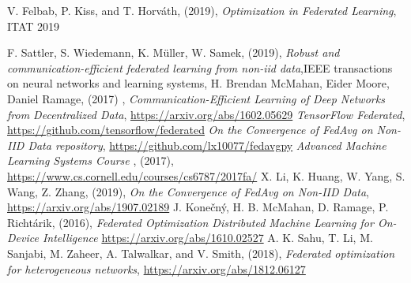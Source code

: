 \documentclass{article}
\theoremstyle{theorem}
\theoremstyle{definition}
\begin{document}
	\begin{thebibliography}{5}
			V. Felbab, P. Kiss, and T. Horváth, (2019), \textit{Optimization in Federated Learning}, ITAT 2019
	
		
		F. Sattler, S. Wiedemann, K. Müller, W. Samek,  (2019), \textit{Robust and communication-efficient federated learning from non-iid data},IEEE transactions on neural networks and learning systems,
		H. Brendan McMahan, Eider Moore, Daniel Ramage, (2017) , \textit{Communication-Efficient Learning of Deep Networks
			from Decentralized Data}, \href{https://arxiv.org/abs/1602.05629}{https://arxiv.org/abs/1602.05629}  
		\textit{TensorFlow Federated}, \href{ https://github.com/tensorflow/federated }{https://github.com/tensorflow/federated}
		\textit{On the Convergence of FedAvg on Non-IID Data
			repository}, \href{ https://github.com/lx10077/fedavgpy }{https://github.com/lx10077/fedavgpy}
	\textit{Advanced Machine Learning Systems Course} , (2017),  \href{https://www.cs.cornell.edu/courses/cs6787/2017fa/}{https://www.cs.cornell.edu/courses/cs6787/2017fa/}	
		X. Li, K. Huang, W. Yang, S. Wang, Z. Zhang, (2019),  \textit{On the Convergence of FedAvg on Non-IID Data}, \href{https://arxiv.org/abs/1907.02189}{https://arxiv.org/abs/1907.02189}
	J. Konečný, H. B. McMahan, D. Ramage, P. Richtárik, (2016),  \textit{	Federated Optimization Distributed Machine Learning for On-Device Intelligence} \href{https://arxiv.org/abs/1610.02527}{https://arxiv.org/abs/1610.02527}
		A. K. Sahu, T. Li, M. Sanjabi, M. Zaheer, A. Talwalkar, and V. Smith, (2018), 
		\textit{Federated optimization for heterogeneous networks}, \href{https://arxiv.org/abs/1812.06127}{https://arxiv.org/abs/1812.06127}
	\end{thebibliography}
\end{document}
